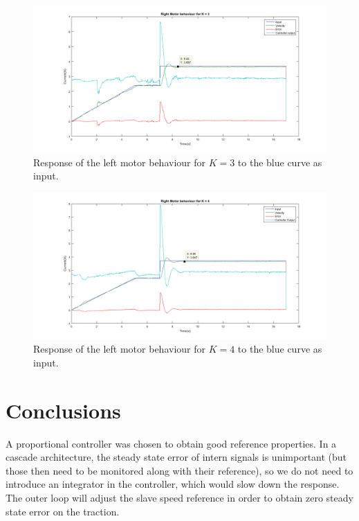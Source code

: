 \begin{figure}[htbp]
\centering
\includegraphics[width = \textwidth]{pics/RM_K3.png}
\caption{Response of the left motor behaviour for $K = 3$ to the blue curve as input.}
\label{fig:RM_K3}
\end{figure}

\begin{figure}[htbp]
\centering
\includegraphics[width = \textwidth]{pics/RM_K4.png}
\caption{Response of the left motor behaviour for $K = 4$ to the blue curve as input.}
\label{fig:RM_K4}
\end{figure}


\section{Conclusions}
A proportional controller was chosen to obtain good reference properties. In a cascade architecture, the steady state error of intern signals is unimportant (but those then need to be monitored along with their reference), so we do not need to introduce an integrator in the controller, which would slow down the response. The outer loop will adjust the slave speed reference in order to obtain zero steady state error on the traction.

